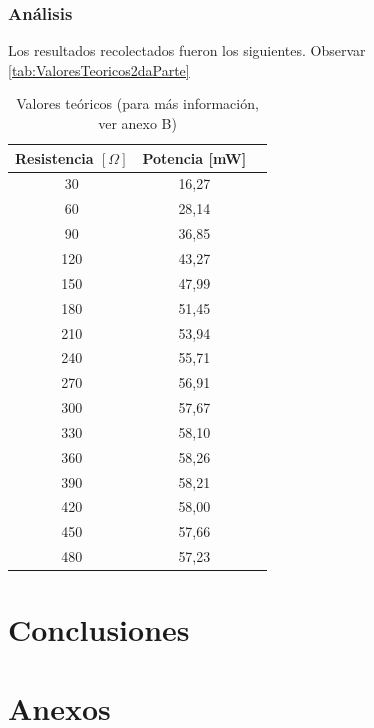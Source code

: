 \documentclass{article}
\begin{document}
            
            
            \subsubsection{Análisis}
                \quad Los resultados recolectados fueron los siguientes. Observar \autoref{tab:ValoresTeoricos2daParte}

            \begin{table}[h!]
            \centering
                \begin{tabular}{|c|c|c|}
                \hline
                Resistencia  $[\Omega]$     & Potencia [mW]         \\ \hline
                30                          & 16,27                 \\ \hline
                60                          & 28,14                 \\ \hline
                90                          & 36,85                 \\ \hline
                120                         & 43,27                 \\ \hline
                150                         & 47,99                 \\ \hline
                180                         & 51,45                 \\ \hline
                210                         & 53,94                 \\ \hline
                240                         & 55,71                 \\ \hline
                270                         & 56,91                 \\ \hline
                300                         & 57,67                 \\ \hline
                330                         & 58,10                 \\ \hline
                360                         & 58,26                 \\ \hline
                390                         & 58,21                 \\ \hline
                420                         & 58,00                 \\ \hline
                450                         & 57,66                 \\ \hline
                480                         & 57,23                 \\ \hline
                \end{tabular}
            \caption{Valores teóricos (para más información, ver anexo B)}
            \label{tab:ValoresTeoricos2daParte}
            \end{table}


    \section{Conclusiones}

    \section{Anexos}
\end{document}
